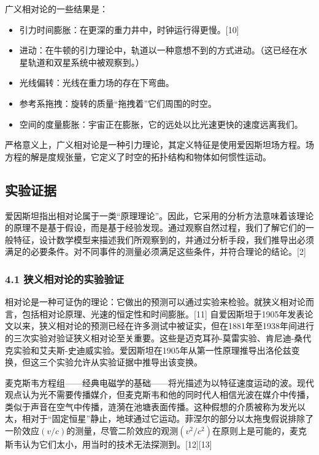 广义相对论的一些结果是：

\begin{itemize}
\item 引力时间膨胀：在更深的重力井中，时钟运行得更慢。[10]
\item 进动：在牛顿的引力理论中，轨道以一种意想不到的方式进动。（这已经在水星轨道和双星系统中被观察到。）
\item 光线偏转：光线在重力场的存在下弯曲。
\item 参考系拖拽：旋转的质量“拖拽着”它们周围的时空。
\item 空间的度量膨胀：宇宙正在膨胀，它的远处以比光速更快的速度远离我们。
\end{itemize}

严格意义上，广义相对论是一种引力理论，其定义特征是使用爱因斯坦场方程。场方程的解是度规张量，它定义了时空的拓扑结构和物体如何惯性运动。

\subsection{实验证据}

爱因斯坦指出相对论属于一类“原理理论”。因此，它采用的分析方法意味着该理论的原理不是基于假设，而是基于经验发现。通过观察自然过程，我们了解它们的一般特征，设计数学模型来描述我们所观察到的，并通过分析手段，我们推导出必须满足的必要条件。对不同事件的测量必须满足这些条件，并符合理论的结论。[2]

\subsubsection{4.1 狭义相对论的实验验证}

相对论是一种可证伪的理论：它做出的预测可以通过实验来检验。就狭义相对论而言，包括相对论原理、光速的恒定性和时间膨胀。[11] 自爱因斯坦于1905年发表论文以来，狭义相对论的预测已经在许多测试中被证实，但在1881年至1938年间进行的三次实验对验证狭义相对论至关重要。这些是迈克耳孙-莫雷实验、肯尼迪-桑代克实验和艾夫斯-史迪威实验。爱因斯坦在1905年从第一性原理推导出洛伦兹变换，但这三个实验允许从实验证据中推导出该变换。

麦克斯韦方程组——经典电磁学的基础——将光描述为以特征速度运动的波。现代观点认为光不需要传播媒介，但麦克斯韦和他的同时代人相信光波在媒介中传播，类似于声音在空气中传播，涟漪在池塘表面传播。这种假想的介质被称为发光以太，相对于“固定恒星”静止，地球通过它运动。菲涅尔的部分以太拖曳假说排除了一阶效应$(v/c)$的测量，尽管二阶效应的观测$( v^2/c^2)$在原则上是可能的，麦克斯韦认为它们太小，用当时的技术无法探测到。[12][13]

